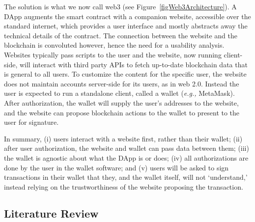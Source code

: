 \documentclass[conference]{IEEEtran}
\begin{document}
The solution is what we now call web3 (see Figure~\ref{figWeb3Architecture}). A DApp augments the smart contract with a companion website, accessible over the standard internet, which provides a user interface and mostly abstracts away the technical details of the contract. The connection between the website and the blockchain is convoluted however, hence the need for a usability analysis. Websites typically pass scripts to the user and the website, now running client-side, will interact with third party APIs to fetch up-to-date blockchain data that is general to all users. To customize the content for the specific user, the website does not maintain accounts server-side for its users, as in web 2.0. Instead the user is expected to run a standalone client, called a wallet (\textit{e.g.,} MetaMask). After authorization, the wallet will supply the user's addresses to the website, and the website can propose blockchain actions to the wallet to present to the user for signature. 

In summary, (i) users interact with a website first, rather than their wallet; (ii) after user authorization, the website and wallet can pass data between them; (iii) the wallet is agnostic about what the DApp is or does; (iv) all authorizations are done by the user in the wallet software; and (v) users will be asked to sign transactions in their wallet that they, and the wallet itself, will not `understand,' instead relying on the trustworthiness of the website proposing the transaction.


\subsection{Literature Review}
\end{document}

